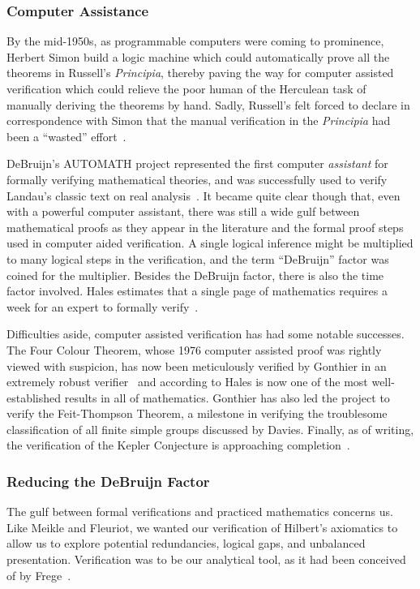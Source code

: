 \subsubsection{Computer Assistance}
By the mid-1950s, as programmable computers were coming to prominence, Herbert Simon build a logic machine which could automatically prove all the theorems in Russell's \emph{Principia}, thereby paving the way for computer assisted verification which could relieve the poor human of the Herculean task of manually deriving the theorems by hand. Sadly, Russell's felt forced to declare in correspondence with Simon that the manual verification in the \emph{Principia} had been a ``wasted'' effort~\cite{SimonObituary}.

DeBruijn's AUTOMATH project represented the first computer \emph{assistant} for formally verifying mathematical theories, and was successfully used to verify Landau's classic text on real analysis~\cite{LandauGrundlagen,LandauAUTOMATH}. It became quite clear though that, even with a powerful computer assistant, there was still a wide gulf between mathematical proofs as they appear in the literature and the formal proof steps used in computer aided verification. A single logical inference might be multiplied to many logical steps in the verification, and the term ``DeBruijn'' factor was coined for the multiplier. Besides the DeBruijn factor, there is also the time factor involved. Hales estimates that a single page of mathematics requires a week for an expert to formally verify~\cite{HalesFormalisingCost}.

Difficulties aside, computer assisted verification has had some notable successes. The Four Colour Theorem, whose 1976 computer assisted proof was rightly viewed with suspicion, has now been meticulously verified by Gonthier in an extremely robust verifier~\cite{GonthierFCT} and according to Hales is now one of the most well-established results in all of mathematics. Gonthier has also led the project to verify the Feit-Thompson Theorem, a milestone in verifying the troublesome classification of all finite simple groups discussed by Davies. Finally, as of writing, the verification of the Kepler Conjecture is approaching completion~\cite{flyspeck}.

\subsubsection{Reducing the DeBruijn Factor}
The gulf between formal verifications and practiced mathematics concerns us. Like Meikle and Fleuriot, we wanted our verification of Hilbert's axiomatics to allow us to explore potential redundancies, logical gaps, and unbalanced presentation. Verification was to be our analytical tool, as it had been conceived of by Frege~\cite{ProofsAboutProofs}. 

